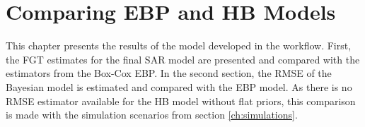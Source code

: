 \chapter{Comparing EBP and HB Models}

This chapter presents the results of the model developed in the workflow.
First, the FGT estimates for the final SAR model are presented and compared with the estimators from the Box-Cox EBP.
In the second section, the RMSE of the Bayesian model is estimated and compared with the EBP model.
As there is no RMSE estimator available for the HB model without flat priors, this comparison is made with the simulation scenarios from section \ref{ch:simulations}.









